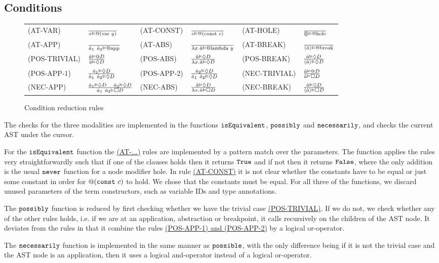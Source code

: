 \subsection{Conditions}

\begin{figure}
  \center
  \renewcommand{\arraystretch}{2}
  \begin{tabular}{llllll}
    \scriptsize(AT-VAR)      & $\frac{} {x \vDash @(\text{var }y)}$      & \scriptsize(AT-CONST)  & $\frac{} {c \vDash @(\text{const }c)}$   & \scriptsize(AT-HOLE)   & $\frac{} {\llparenthesis\rrparenthesis \vDash @\text{hole}}$   \\
    \scriptsize(AT-APP)      & $\frac{} {\hat{a}_1~\hat{a}_2 \vDash @\text{app}}$      & \scriptsize(AT-ABS)    & $\frac{} {\lambda x.\hat{a} \vDash @\text{lambda }y}$     & \scriptsize(AT-BREAK)  & $\frac{} {\langle \hat{a} \rangle \vDash @\text{break}}$  \\
    \scriptsize(POS-TRIVIAL) & $\frac{\hat{a} \vDash @D} {\hat{a} \vDash \Diamond D}$ & \scriptsize(POS-ABS)   & $\frac{\hat{a} \vDash \Diamond D} {\lambda x.\hat{a} \vDash \Diamond D}$    & \scriptsize(POS-BREAK) & $\frac{\hat{a} \vDash \Diamond D} {\langle \hat{a} \rangle \vDash \Diamond D}$ \\
    \scriptsize(POS-APP-1)   & $\frac{\hat{a}_1 \vDash \Diamond D} {\hat{a}_1~\hat{a}_2 \vDash \Diamond D}$  & \scriptsize(POS-APP-2) & $\frac{\hat{a}_2 \vDash \Diamond D} {\hat{a}_1~\hat{a}_2 \vDash \Diamond D}$ &   \scriptsize(NEC-TRIVIAL) & $\frac{\hat{a} \vDash @D} {\hat{a} \vDash \Box D}$ \\
    \scriptsize(NEC-APP)     & $\frac{\hat{a}_1 \vDash \Diamond D\quad\hat{a}_2 \vDash \Diamond D} {\hat{a}_1~\hat{a}_2 \vDash \Box D}$     & \scriptsize(NEC-ABS)   & $\frac{\hat{a} \vDash \Diamond D} {\lambda x.\hat{a} \vDash \Box D}$    & \scriptsize(NEC-BREAK) & $\frac{\hat{a} \vDash \Diamond D} {\langle \hat{a} \rangle \vDash \Box D}$
  \end{tabular}
  \caption{Condition reduction rules}
  \label{fig:conditionreductionrules}
\end{figure}

The checks for the three modalities are implemented in the functions
$\texttt{isEquivalent}$, $\texttt{possibly}$ and $\texttt{necessarily}$, and checks the
current AST under the cursor.

For the $\texttt{isEquivalent}$ function the
\hyperref[fig:conditionreductionrules]{(AT-...)} rules are implemented by a
pattern match over the parameters.
The function applies the rules very straightforwardly such that if one of the
clauses holds then it returns $\texttt{True}$ and if not then it returns
$\texttt{False}$, where the only addition is the usual $\texttt{never}$ function
for a node modifier hole. In rule
\hyperref[fig:conditionreductionrules]{(AT-CONST)} it is not clear whether the
constants have to be equal or just some constant in order for $@(\texttt{const}~c)$ to
hold. We chose that the constants must be equal.
For all three of the functions, we discard unused parameters of the term
constructors, such as variable IDs and type annotations.

The $\texttt{possibly}$ function is reduced by first checking whether we have the
trivial case \hyperref[fig:conditionreductionrules]{(POS-TRIVIAL)}. If we do
not, we check whether any of the other rules holds, i.e. if we are at an
application, abstraction or breakpoint, it calls recursively on the children of
the AST node. It deviates from the rules in that it combine the rules
\hyperref[fig:conditionreductionrules]{(POS-APP-1) and (POS-APP-2)} by a logical
or-operator.

The $\texttt{necessarily}$ function is implemented in the same manner as
$\texttt{possible}$, with the only difference being if it is not the trivial case
and the AST node is an application, then it uses a logical and-operator instead
of a logical or-operator.
